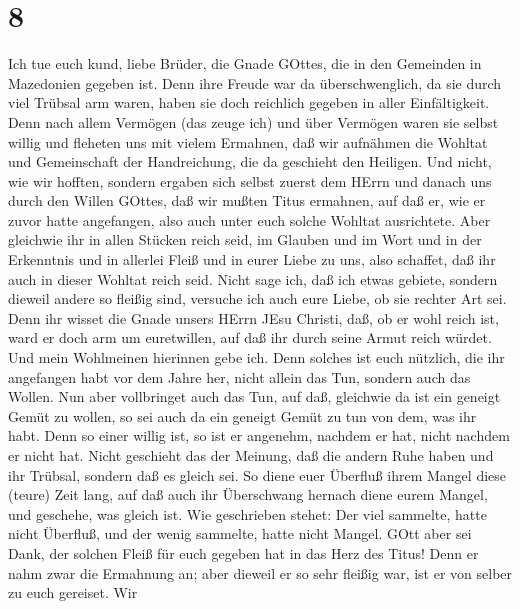 \hypertarget{section-7}{%
\section{8}\label{section-7}}

 Ich tue euch kund, liebe Brüder, die Gnade GOttes, die in
den Gemeinden in Mazedonien gegeben ist.  Denn ihre Freude
war da überschwenglich, da sie durch viel Trübsal arm waren, haben sie
doch reichlich gegeben in aller Einfältigkeit.  Denn nach
allem Vermögen (das zeuge ich) und über Vermögen waren sie selbst willig
 und fleheten uns mit vielem Ermahnen, daß wir aufnähmen die
Wohltat und Gemeinschaft der Handreichung, die da geschieht den
Heiligen.  Und nicht, wie wir hofften, sondern ergaben sich
selbst zuerst dem HErrn und danach uns durch den Willen GOttes,
 daß wir mußten Titus ermahnen, auf daß er, wie er zuvor
hatte angefangen, also auch unter euch solche Wohltat ausrichtete.
 Aber gleichwie ihr in allen Stücken reich seid, im Glauben
und im Wort und in der Erkenntnis und in allerlei Fleiß und in eurer
Liebe zu uns, also schaffet, daß ihr auch in dieser Wohltat reich seid.
 Nicht sage ich, daß ich etwas gebiete, sondern dieweil
andere so fleißig sind, versuche ich auch eure Liebe, ob sie rechter Art
sei.  Denn ihr wisset die Gnade unsers HErrn JEsu Christi,
daß, ob er wohl reich ist, ward er doch arm um euretwillen, auf daß ihr
durch seine Armut reich würdet.  Und mein Wohlmeinen
hierinnen gebe ich. Denn solches ist euch nützlich, die ihr angefangen
habt vor dem Jahre her, nicht allein das Tun, sondern auch das Wollen.
 Nun aber vollbringet auch das Tun, auf daß, gleichwie da
ist ein geneigt Gemüt zu wollen, so sei auch da ein geneigt Gemüt zu tun
von dem, was ihr habt.  Denn so einer willig ist, so ist er
angenehm, nachdem er hat, nicht nachdem er nicht hat. 
Nicht geschieht das der Meinung, daß die andern Ruhe haben und ihr
Trübsal, sondern daß es gleich sei.  So diene euer Überfluß
ihrem Mangel diese (teure) Zeit lang, auf daß auch ihr Überschwang
hernach diene eurem Mangel, und geschehe, was gleich ist. 
Wie geschrieben stehet: Der viel sammelte, hatte nicht Überfluß, und der
wenig sammelte, hatte nicht Mangel.  GOtt aber sei Dank,
der solchen Fleiß für euch gegeben hat in das Herz des Titus!
 Denn er nahm zwar die Ermahnung an; aber dieweil er so
sehr fleißig war, ist er von selber zu euch gereiset.  Wir
